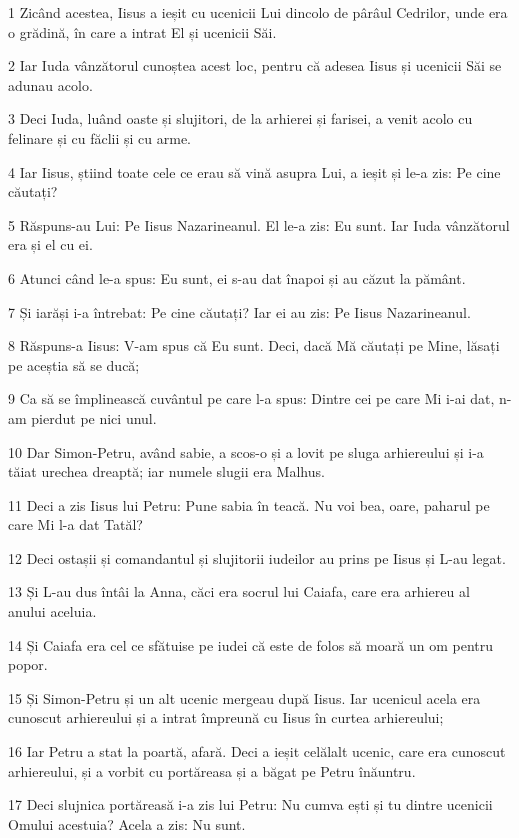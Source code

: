 \par 1 Zicând acestea, Iisus a ieșit cu ucenicii Lui dincolo de pârâul Cedrilor, unde era o grădină, în care a intrat El și ucenicii Săi.
\par 2 Iar Iuda vânzătorul cunoștea acest loc, pentru că adesea Iisus și ucenicii Săi se adunau acolo.
\par 3 Deci Iuda, luând oaste și slujitori, de la arhierei și farisei, a venit acolo cu felinare și cu făclii și cu arme.
\par 4 Iar Iisus, știind toate cele ce erau să vină asupra Lui, a ieșit și le-a zis: Pe cine căutați?
\par 5 Răspuns-au Lui: Pe Iisus Nazarineanul. El le-a zis: Eu sunt. Iar Iuda vânzătorul era și el cu ei.
\par 6 Atunci când le-a spus: Eu sunt, ei s-au dat înapoi și au căzut la pământ.
\par 7 Și iarăși i-a întrebat: Pe cine căutați? Iar ei au zis: Pe Iisus Nazarineanul.
\par 8 Răspuns-a Iisus: V-am spus că Eu sunt. Deci, dacă Mă căutați pe Mine, lăsați pe aceștia să se ducă;
\par 9 Ca să se împlinească cuvântul pe care l-a spus: Dintre cei pe care Mi i-ai dat, n-am pierdut pe nici unul.
\par 10 Dar Simon-Petru, având sabie, a scos-o și a lovit pe sluga arhiereului și i-a tăiat urechea dreaptă; iar numele slugii era Malhus.
\par 11 Deci a zis Iisus lui Petru: Pune sabia în teacă. Nu voi bea, oare, paharul pe care Mi l-a dat Tatăl?
\par 12 Deci ostașii și comandantul și slujitorii iudeilor au prins pe Iisus și L-au legat.
\par 13 Și L-au dus întâi la Anna, căci era socrul lui Caiafa, care era arhiereu al anului aceluia.
\par 14 Și Caiafa era cel ce sfătuise pe iudei că este de folos să moară un om pentru popor.
\par 15 Și Simon-Petru și un alt ucenic mergeau după Iisus. Iar ucenicul acela era cunoscut arhiereului și a intrat împreună cu Iisus în curtea arhiereului;
\par 16 Iar Petru a stat la poartă, afară. Deci a ieșit celălalt ucenic, care era cunoscut arhiereului, și a vorbit cu portăreasa și a băgat pe Petru înăuntru.
\par 17 Deci slujnica portăreasă i-a zis lui Petru: Nu cumva ești și tu dintre ucenicii Omului acestuia? Acela a zis: Nu sunt.
